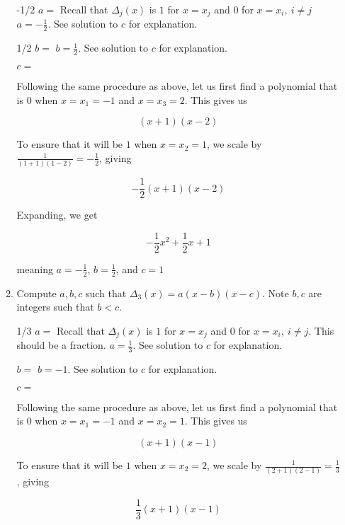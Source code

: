 \documentclass[11pt, preview]{standalone} %
\begin{document}
\begin{enumerate}
\begin{enumerate}
 \begin{Freeform}{-1/2}
 $a = $
 \Hint Recall that $\Delta_j(x)$ is $1$ for $x = x_j$ and $0$ for $x = x_i,\ i \not= j$
 \Solution $a = -\frac{1}{2}$. See solution to $c$ for explanation.
 \end{Freeform}
 \begin{Freeform}{1/2}
 $b = $
 \Solution $b = \frac{1}{2}$. See solution to $c$ for explanation.
 \end{Freeform}
 \begin{Freeform}{1}
 $c = $

 \Solution Following the same procedure as above, let us first find a polynomial that is $0$ when $x = x_1 = -1$ and $x = x_3 = 2$. This gives us 

 $$(x + 1)(x - 2)$$

 To ensure that it will be $1$ when $x = x_2 = 1$, we scale by $\frac{1}{(1 + 1)(1 - 2)} = -\frac{1}{2}$, giving 

 $$-\frac{1}{2}(x + 1)(x - 2)$$

 Expanding, we get 

 $$-\frac{1}{2}x^2 + \frac{1}{2}x + 1$$

 meaning $a = -\frac{1}{2}$, $b = \frac{1}{2}$, and $c = 1$

 \end{Freeform}

\item Compute $a,b,c$ such that $\Delta_3(x) = a(x-b)(x-c)$. Note $b, c$ are integers such that $b < c$.
 
 \begin{Freeform}{1/3}
 $a = $
 \Hint Recall that $\Delta_j(x)$ is $1$ for $x = x_j$ and $0$ for $x = x_i,\ i \not= j$. This should be a fraction.
 \Solution $a = \frac{1}{3}$. See solution to $c$ for explanation.
 \end{Freeform}
 \begin{Freeform}{-1}
 $b = $
 \Solution $b = -1$. See solution to $c$ for explanation.
 \end{Freeform}
 \begin{Freeform}{1}
 $c = $

 \Solution Following the same procedure as above, let us first find a polynomial that is $0$ when $x = x_1 = -1$ and $x = x_2 = 1$. This gives us 

 $$(x + 1)(x - 1)$$

 To ensure that it will be $1$ when $x = x_2 = 2$, we scale by $\frac{1}{(2 + 1)(2 - 1)} = \frac{1}{3}$, giving 

 $$\frac{1}{3}(x + 1)(x - 1)$$


\end{Freeform}
\end{enumerate}
\end{enumerate}
\end{document}
